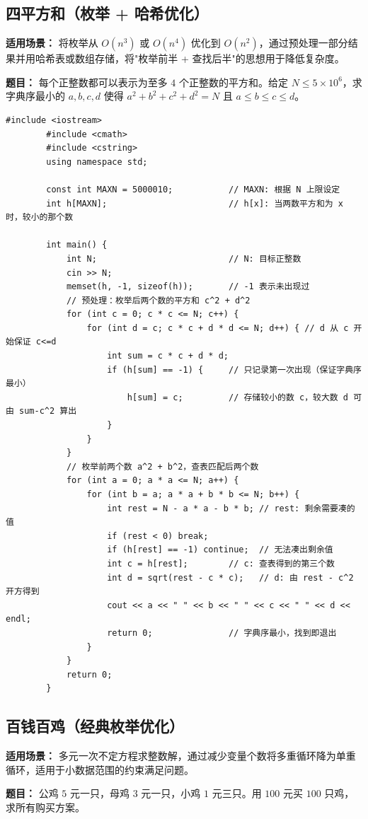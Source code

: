 \documentclass[12pt,a4paper]{ctexart}
\begin{document}
	\subsection{四平方和（枚举 + 哈希优化）}
	\textbf{适用场景：} 将枚举从 $O(n^3)$ 或 $O(n^4)$ 优化到 $O(n^2)$，通过预处理一部分结果并用哈希表或数组存储，将"枚举前半 + 查找后半"的思想用于降低复杂度。
	
	\textbf{题目：} 每个正整数都可以表示为至多 $4$ 个正整数的平方和。给定 $N \le 5\times 10^6$，求字典序最小的 $a,b,c,d$ 使得 $a^2+b^2+c^2+d^2=N$ 且 $a\le b\le c\le d$。
	
	\begin{lstlisting}[caption={四平方和——枚举前两项 + 哈希查表}]
		#include <iostream>
		#include <cmath>
		#include <cstring>
		using namespace std;
		
		const int MAXN = 5000010;           // MAXN: 根据 N 上限设定
		int h[MAXN];                        // h[x]: 当两数平方和为 x 时，较小的那个数
		
		int main() {
			int N;                          // N: 目标正整数
			cin >> N;
			memset(h, -1, sizeof(h));       // -1 表示未出现过
			// 预处理：枚举后两个数的平方和 c^2 + d^2
			for (int c = 0; c * c <= N; c++) {
				for (int d = c; c * c + d * d <= N; d++) { // d 从 c 开始保证 c<=d
					int sum = c * c + d * d;
					if (h[sum] == -1) {     // 只记录第一次出现（保证字典序最小）
						h[sum] = c;         // 存储较小的数 c，较大数 d 可由 sum-c^2 算出
					}
				}
			}
			// 枚举前两个数 a^2 + b^2，查表匹配后两个数
			for (int a = 0; a * a <= N; a++) {
				for (int b = a; a * a + b * b <= N; b++) {
					int rest = N - a * a - b * b; // rest: 剩余需要凑的值
					if (rest < 0) break;
					if (h[rest] == -1) continue;  // 无法凑出剩余值
					int c = h[rest];        // c: 查表得到的第三个数
					int d = sqrt(rest - c * c);   // d: 由 rest - c^2 开方得到
					cout << a << " " << b << " " << c << " " << d << endl;
					return 0;               // 字典序最小，找到即退出
				}
			}
			return 0;
		}
	\end{lstlisting}
	
	\subsection{百钱百鸡（经典枚举优化）}
	\textbf{适用场景：} 多元一次不定方程求整数解，通过减少变量个数将多重循环降为单重循环，适用于小数据范围的约束满足问题。
	
	\textbf{题目：} 公鸡 $5$ 元一只，母鸡 $3$ 元一只，小鸡 $1$ 元三只。用 $100$ 元买 $100$ 只鸡，求所有购买方案。
	
\end{document}
